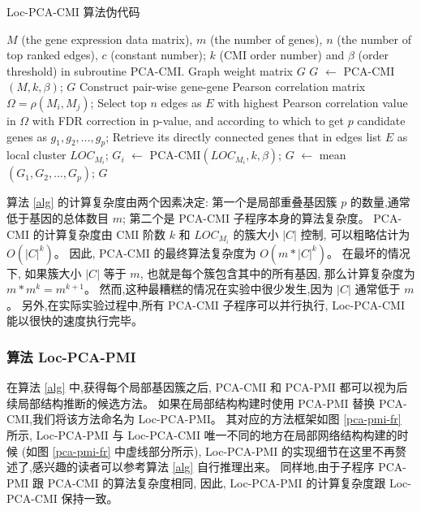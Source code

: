 \begin{algorithm}[!htbp]
    \caption{Loc-PCA-CMI 算法伪代码}
    \label{alg}
    \begin{algorithmic}[1]
    \Require $M$ (the gene expression data matrix), $m$ (the number of genes), $n$ (the number of top ranked edges), $c$ (constant number); $k$ (CMI order number) and $\beta$ (order threshold) in subroutine PCA-CMI.
    \Ensure Graph weight matrix $G$ 
    \State $G$ $\leftarrow$ PCA-CMI$(M, k, \beta)$;
    \State \Return $G$
    \Else
    \State Construct pair-wise gene-gene Pearson correlation matrix $\Omega = \rho(M_i, M_j)$;
    \State Select top $n$ edges as $E$ with highest Pearson correlation value in $\Omega$ with FDR correction in p-value, and according to which to get 
    $p$ candidate genes as $g_1,g_2,\ldots,g_{p}$;
      \State Retrieve its directly connected genes that in edges list $E$ as local cluster $LOC_{M_i}$;
    \EndFor
      \State $G_{i}$ $\leftarrow$ PCA-CMI$(LOC_{M_i}, k, \beta)$;
    \EndFor
    \State $G$ $\leftarrow$ mean$(G_{1},G_{2},\ldots,G_{p})$;
    \State \Return $G$ 
    \EndIf
    \end{algorithmic}
\end{algorithm}

算法 \ref{alg} 的计算复杂度由两个因素决定:
 第一个是局部重叠基因簇 $p$ 的数量,通常低于基因的总体数目 $m$; 
第二个是 PCA-CMI 子程序本身的算法复杂度。
 PCA-CMI 的计算复杂度由 CMI 阶数 $k$ 和 $LOC_{M_i}$ 的簇大小 $|C|$ 控制,
可以粗略估计为 $O(|C|^k)$。
因此, PCA-CMI 的最终算法复杂度为 $O(m *|C|^k)$。
在最坏的情况下, 如果簇大小 $|C|$ 等于 $m$, 也就是每个簇包含其中的所有基因, 
那么计算复杂度为 $m*m^k = m^{k+1}$。 
然而,这种最糟糕的情况在实验中很少发生,因为 $|C|$ 通常低于 $m$。
另外,在实际实验过程中,所有 PCA-CMI 子程序可以并行执行, Loc-PCA-CMI 能以很快的速度执行完毕。

\subsubsection{算法 Loc-PCA-PMI }

在算法 \ref{alg} 中,获得每个局部基因簇之后,
 PCA-CMI 和 PCA-PMI 都可以视为后续局部结构推断的候选方法。
如果在局部结构构建时使用 PCA-PMI 替换 PCA-CMI,我们将该方法命名为 Loc-PCA-PMI。
其对应的方法框架如图 \ref{pca-pmi-fr} 所示, 
 Loc-PCA-PMI 与 Loc-PCA-CMI 唯一不同的地方在局部网络结构构建的时候 (如图 \ref{pca-pmi-fr} 中虚线部分所示),
 Loc-PCA-PMI 的实现细节在这里不再赘述了,感兴趣的读者可以参考算法 \ref{alg} 自行推理出来。
同样地,由于子程序 PCA-PMI 跟 PCA-CMI 的算法复杂度相同,
因此, Loc-PCA-PMI 的计算复杂度跟 Loc-PCA-CMI 保持一致。

